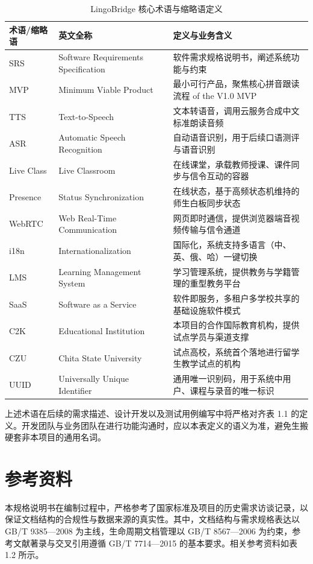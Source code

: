 \begin{table}[H]
\centering
\caption{LingoBridge 核心术语与缩略语定义}
\begin{tabularx}{\textwidth}{l p{4cm} X}
\toprule
\textbf{术语/缩略语} & \textbf{英文全称} & \textbf{定义与业务含义} \\
\midrule
SRS & Software Requirements Specification & 软件需求规格说明书，阐述系统功能与约束 \\
MVP & Minimum Viable Product & 最小可行产品，聚焦核心拼音跟读流程 of the V1.0 MVP \\
TTS & Text-to-Speech & 文本转语音，调用云服务合成中文标准朗读音频 \\
ASR & Automatic Speech Recognition & 自动语音识别，用于后续口语测评与语音识别 \\
Live Class & Live Classroom & 在线课堂，承载教师授课、课件同步与信令互动的容器 \\
Presence & Status Synchronization & 在线状态，基于高频状态机维持的师生白板同步状态 \\
WebRTC & Web Real-Time Communication & 网页即时通信，提供浏览器端音视频传输与信令通道 \\
i18n & Internationalization & 国际化，系统支持多语言（中、英、俄、哈）一键切换 \\
LMS & Learning Management System & 学习管理系统，提供教务与学籍管理的重型教务平台 \\
SaaS & Software as a Service & 软件即服务，多租户多学校共享的基础设施软件模式 \\
C2K & Educational Institution & 本项目的合作国际教育机构，提供试点学员与渠道支撑 \\
CZU & Chita State University & 试点高校，系统首个落地进行留学生教学试点的机构 \\
UUID & Universally Unique Identifier & 通用唯一识别码，用于系统中用户、课程与录音的唯一标识 \\
\bottomrule
\end{tabularx}
\end{table}

上述术语在后续的需求描述、设计开发以及测试用例编写中将严格对齐表 1.1 的定义。开发团队与业务团队在进行功能沟通时，应以本表定义的语义为准，避免生搬硬套非本项目的通用名词。

\section{参考资料}
本规格说明书在编制过程中，严格参考了国家标准及项目的历史需求访谈记录，以保证文档结构的合规性与数据来源的真实性。其中，文档结构与需求规格表达以 GB/T 9385---2008 为主线，生命周期文档管理以 GB/T 8567---2006 为约束，参考文献著录与交叉引用遵循 GB/T 7714---2015 的基本要求\cite{gb9385,gb8567,gb7714}。相关参考资料如表 1.2 所示。

